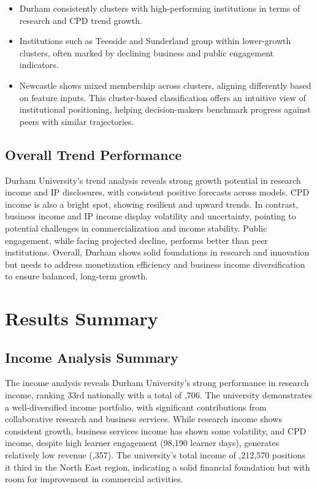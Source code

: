 \documentclass[journal,onecolumn, 10pt,draftclsnofoot]{IEEEtran}
\begin{document}
\begin{itemize}
    \item Durham consistently clusters with high-performing institutions in terms of research and CPD trend growth.
    \item Institutions such as Teesside and Sunderland group within lower-growth clusters, often marked by declining business and public engagement indicators.
    \item Newcastle shows mixed membership across clusters, aligning differently based on feature inputs. This cluster-based classification offers an intuitive view of institutional positioning, helping decision-makers benchmark progress against peers with similar trajectories.
\end{itemize}

\subsection{Overall Trend Performance}

Durham University's trend analysis reveals strong growth potential in research income and IP disclosures, with consistent positive forecasts across models. CPD income is also a bright spot, showing resilient and upward trends. In contrast, business income and IP income display volatility and uncertainty, pointing to potential challenges in commercialization and income stability. Public engagement, while facing projected decline, performs better than peer institutions. Overall, Durham shows solid foundations in research and innovation but needs to address monetization efficiency and business income diversification to ensure balanced, long-term growth.

\section{Results Summary}

\subsection{Income Analysis Summary}

The income analysis reveals Durham University's strong performance in research income, ranking 33rd nationally with a total of ,706. The university demonstrates a well-diversified income portfolio, with significant contributions from collaborative research and business services. While research income shows consistent growth, business services income has shown some volatility, and CPD income, despite high learner engagement (98,190 learner days), generates relatively low revenue (,357). The university's total income of ,212,570 positions it third in the North East region, indicating a solid financial foundation but with room for improvement in commercial activities.
\end{document}
